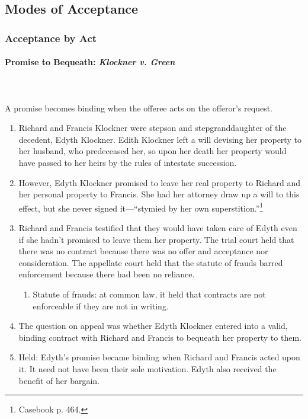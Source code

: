 \subsection{Modes of Acceptance}

\subsubsection{Acceptance by Act}

\paragraph{Promise to Bequeath: \emph{Klockner v. Green}}
~\\\\
A promise becomes binding when the offeree acts on the offeror's request.

\begin{enumerate}
    \item Richard and Francis Klockner were stepson and stepgranddaughter of 
    the decedent, Edyth Klockner. Edith Klockner left a will devising her 
    property to her husband, who predeceased her, so upon her death her 
    property would have passed to her heirs by the rules of intestate 
    succession.
    \item However, Edyth Klockner promised to leave her real property to 
    Richard and her personal property to Francis. She had her attorney draw up 
    a will to this effect, but she never signed it---``stymied by her own 
    superstition.''\footnote{Casebook p. 464.}
    \item Richard and Francis testified that they would have taken care of 
    Edyth even if she hadn't promised to leave them her property. The trial 
    court held that there was no contract because there was no offer and 
    acceptance nor consideration. The appellate court held that the statute 
    of frauds barred enforcement because there had been no reliance.
    \begin{enumerate}
        \item Statute of frauds: at common law, it held that contracts are not 
        enforceable if they are not in writing.
    \end{enumerate}
    \item The question on appeal was whether Edyth Klockner entered into a 
    valid, binding contract with Richard and Francis to bequeath her property 
    to them.
    \item Held: Edyth's promise became binding when Richard and Francis acted 
    upon it. It need not have been their sole motivation. Edyth also received 
    the benefit of her bargain.
\end{enumerate}

